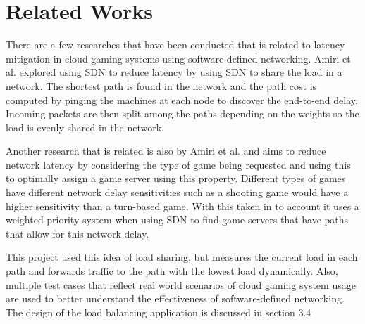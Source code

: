 \section{Related Works}
There are a few researches that have been conducted that is related to latency mitigation in cloud gaming systems using software-defined networking. Amiri et al. \cite{amiri2015sdn1} explored using SDN to reduce latency by using SDN to share the load in a network. The shortest path is found in the network and the path cost is computed by pinging the machines at each node to discover the end-to-end delay. Incoming packets are then split among the paths depending on the weights so the load is evenly shared in the network.
\newline
\par
Another research that is related is also by Amiri et al. \cite{amiri2015sdn2} and aims to reduce network latency by considering the type of game being requested and using this to optimally assign a game server using this property. Different types of games have different network delay sensitivities such as a shooting game would have a higher sensitivity than a turn-based game. With this taken in to account it uses a weighted priority system when using SDN to find game servers that have paths that allow for this network delay.
\newline
\par
This project used this idea of load sharing, but measures the current load in each path and forwards traffic to the path with the lowest load dynamically. Also, multiple test cases that reflect real world scenarios of cloud gaming system usage are used to better understand the effectiveness of software-defined networking. The design of the load balancing application is discussed in section 3.4